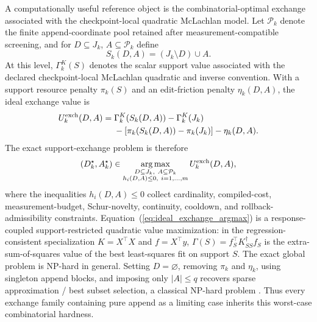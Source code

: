 \documentclass[
  reprint,
  amsmath,
  amssymb,
  aps,
  pra,
  nofootinbib,
  superscriptaddress,
  floatfix
]{revtex4-2}
\begin{document}
A computationally useful reference object is the combinatorial-optimal exchange associated with the checkpoint-local quadratic McLachlan model.  Let \(\mathcal P_k\) denote the finite append-coordinate pool retained after measurement-compatible screening, and for \(D\subseteq J_k\), \(A\subseteq\mathcal P_k\) define
\begin{equation}
S_k(D,A)=(J_k\setminus D)\cup A .
\label{eq:exchange_support_set}
\end{equation}
At this level, \(\Gamma_k^K(S)\) denotes the scalar support value associated
with the declared checkpoint-local McLachlan quadratic and inverse convention.
With a support resource penalty \(\pi_k(S)\) and an edit-friction penalty \(\eta_k(D,A)\), the ideal exchange value is
\begin{equation}
\begin{aligned}
U_k^{\rm exch}(D,A)
={}&
\Gamma_k^K(S_k(D,A))-\Gamma_k^K(J_k)\\
&-\left[\pi_k(S_k(D,A))-\pi_k(J_k)\right]
-\eta_k(D,A).
\end{aligned}
\label{eq:ideal_exchange_value}
\end{equation}
The exact support-exchange problem is therefore
\begin{equation}
(D_k^\star,A_k^\star)
\in
\operatorname*{arg\,max}_{\substack{D\subseteq J_k,\ A\subseteq\mathcal P_k\\
h_i(D,A)\le0,\ i=1,\ldots,m}}
U_k^{\rm exch}(D,A),
\label{eq:ideal_exchange_argmax}
\end{equation}
where the inequalities \(h_i(D,A)\le0\) collect cardinality, compiled-cost, measurement-budget, Schur-novelty, continuity, cooldown, and rollback-admissibility constraints.  Equation~(\ref{eq:ideal_exchange_argmax}) is a response-coupled support-restricted quadratic value maximization: in the regression-consistent specialization \(K=X^\top X\) and \(f=X^\top y\), \(\Gamma(S)=f_S^\top K_{SS}^{\dagger}f_S\) is the extra-sum-of-squares value of the best least-squares fit on support \(S\).  The exact global problem is NP-hard in general.  Setting \(D=\varnothing\), removing \(\pi_k\) and \(\eta_k\), using singleton append blocks, and imposing only \(|A|\le q\) recovers sparse approximation / best subset selection, a classical NP-hard problem \cite{Natarajan1995SparseApprox,BertsimasKingMazumder2016}.  Thus every exchange family containing pure append as a limiting case inherits this worst-case combinatorial hardness.
\end{document}
